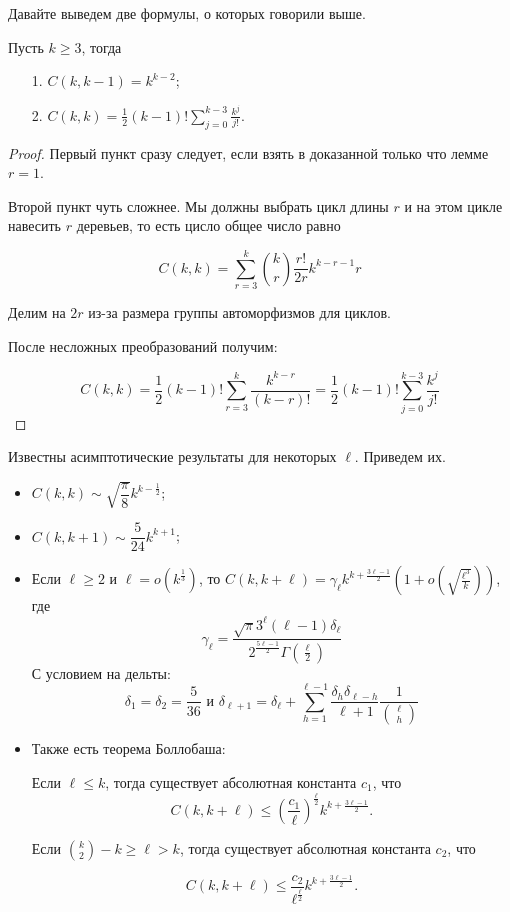 Давайте выведем две формулы, о которых говорили выше.

\begin{lemma}
  Пусть $k \geq 3$, тогда 
  \begin{itemize}
    \item[1.] $C(k, k - 1) = k^{k - 2}$;
    \item[2.] $C(k, k) = \frac12 (k - 1)! \sum\limits_{j = 0}^{k - 3} \frac{k^j}{j!}$.
  \end{itemize}
\end{lemma}

\begin{proof}
  Первый пункт сразу следует, если взять в доказанной только что лемме $r = 1$.

  Второй пункт чуть сложнее. Мы должны выбрать цикл длины $r$ 
  и на этом цикле навесить $r$ деревьев,
  то есть цисло общее число равно

  \[
    C(k, k) = \sum\limits_{r = 3}^k \binom{k}{r} \frac{r!}{2r} k^{k - r - 1}r
  \]

  Делим на $2r$ из-за размера группы автоморфизмов для циклов.

  После несложных преобразований получим:

  \[
    C(k, k) = \frac12 (k - 1)! \sum\limits_{r = 3}^k \frac{k^{k - r}}{(k - r)!}
    = \frac12 (k - 1)! \sum\limits_{j = 0}^{k - 3} \frac{k^j}{j!}
  \]
\end{proof}

Известны асимптотические результаты для некоторых $\ell$. Приведем их.

\begin{itemize}
  \item $C(k, k) \sim \sqrt{\dfrac{\pi}{8}}k^{k - \frac12}$;
  \item $C(k, k + 1) \sim \dfrac{5}{24} k^{k + 1}$;
  \item Если $\ell \geq 2$ и $\ell = o\left(k^{\frac13}\right)$, то $C(k, k + \ell) =
  \gamma_{\ell} k^{k + \frac{3\ell - 1}{2}}
  \left(1 + o\left(\sqrt{\frac{\ell^3}{k}}\right)\right)$, где
  $$\gamma_{\ell} = \dfrac{\sqrt{\pi} 3^{\ell}(\ell - 1)\delta_{\ell}}{2^{\frac{5\ell -1}{2}} 
  \Gamma\left(\frac{\ell}{2}\right)}$$ С условием на дельты: $$\delta_1 = \delta_2 = \frac{5}{36} \text{ и }
  \delta_{\ell + 1} = \delta_{\ell} + \sum\limits_{h = 1}^{\ell - 1} 
  \frac{\delta_h \delta_{\ell - h}}{\ell + 1} \frac{1}{\binom{\ell}{h}}$$

  \item Также есть теорема Боллобаша:

  Если $\ell \leq k$, тогда существует абсолютная константа $c_1$, что 
  \[
    C(k, k + \ell) \leq \left(\dfrac{c_1}{\ell}\right)^{
    \frac{\ell}{2}} k^{k + \frac{3\ell - 1}{2}}.
  \]

  Если $\binom{k}{2} - k \geq \ell > k$, тогда существует абсолютная константа $c_2$, что

  \[
    C(k, k + \ell) \leq \frac{c_2}{\ell^{\frac{\ell}{2}}} 
    k^{k + \frac{3\ell - 1}{2}}.
  \]
\end{itemize}


